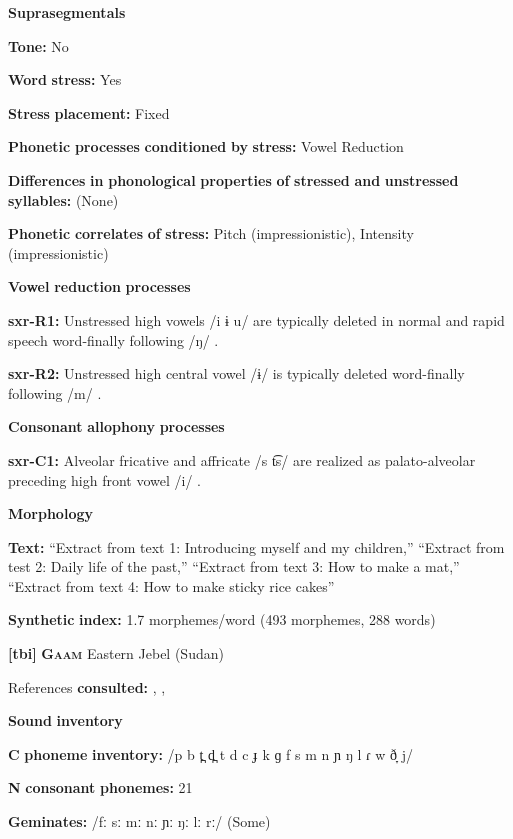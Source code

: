 \begin{styleBody}
\textbf{Suprasegmentals}

\textbf{Tone:} No

\textbf{Word} \textbf{stress:} Yes

\textbf{Stress} \textbf{placement:} Fixed

\textbf{Phonetic} \textbf{processes} \textbf{conditioned} \textbf{by} \textbf{stress:} Vowel Reduction

\textbf{Differences} \textbf{in} \textbf{phonological} \textbf{properties} \textbf{of} \textbf{stressed} \textbf{and} \textbf{unstressed} \textbf{syllables:} (None)

\textbf{Phonetic} \textbf{correlates} \textbf{of} \textbf{stress:} Pitch (impressionistic), Intensity (impressionistic)

\textbf{Vowel} \textbf{reduction} \textbf{processes}

\textbf{sxr-R1:} Unstressed high vowels /i ɨ u/ are typically deleted in normal and rapid speech word-finally following /ŋ/ \citep[38]{Pan2012}.

\textbf{sxr-R2:} Unstressed high central vowel /ɨ/ is typically deleted word-finally following /m/ \citep[39]{Pan2012}.

\textbf{Consonant} \textbf{allophony} \textbf{processes}

\textbf{sxr-C1:} Alveolar fricative and affricate /s t͡s/ are realized as palato-alveolar preceding high front vowel /i/ \citep[28]{Pan2012}.

\textbf{Morphology}

\textbf{Text:} “Extract from text 1: Introducing myself and my children,” “Extract from test 2: Daily life of the past,” “Extract from text 3: How to make a mat,” “Extract from text 4: How to make sticky rice cakes” \citep[365-372]{Pan2012}

\textbf{Synthetic} \textbf{index:} 1.7 morphemes/word (493 morphemes, 288 words)

\textbf{[tbi]}   \textbf{\textsc{Gaam}}  Eastern Jebel (Sudan)

References \textbf{consulted:} \citet{Bender1983}, \citet{Crewe1975}, \citet{Stirtz2011}

\textbf{Sound} \textbf{inventory}

\textbf{C} \textbf{phoneme} \textbf{inventory:} /p b t̪ d̪ t d c ɟ k ɡ f s m n ɲ ŋ l ɾ w ð̞ j/

\textbf{N} \textbf{consonant} \textbf{phonemes:} 21

\textbf{Geminates:} /fː sː mː nː ɲː ŋː lː rː/ (Some)


\end{styleBody}
